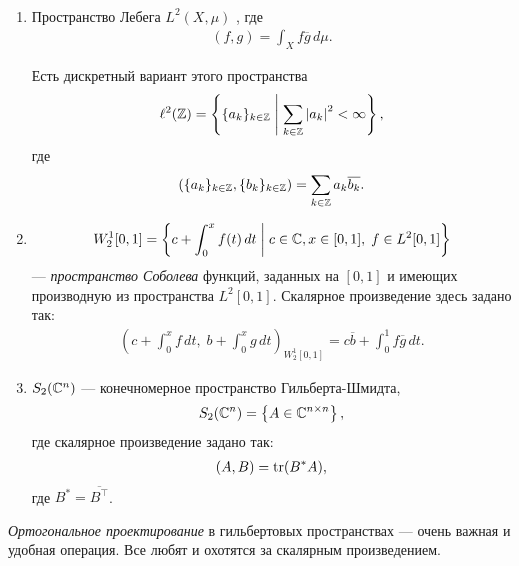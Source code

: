 \documentclass[../complex-analysis.tex]{subfiles}
\begin{document}
\begin{exmpl}\
\begin{enumerate}
 \item Пространство Лебега $ L^{2}(X,\mu) $ , где
  \begin{align*}
   (f,g) = \int_{X} f\overline g\,d\mu. 
  \end{align*}

  Есть дискретный вариант этого пространства
  \begin{align*}
       \ell^{2}(\mathbb{Z}) = \left\{ \{a_{k}\}_{k \in \mathbb{Z}} \;\middle|\; \sum_{k \in \mathbb{Z}}\left| a_k \right|^{2} < \infty  \right\},
  \end{align*} где
  \begin{align*}
   \left( \{a_{k}\}_{k \in \mathbb{Z}}, \{b_{k}\}_{k \in \mathbb{Z}} \right) = \sum_{k \in\mathbb{Z}} a_k \overline{b_k}.
  \end{align*}
 \item 
  \begin{align*}
   W_2^{1} [0,1] = \left\{ c + \int_{0}^{x} f(t)\,dt \;\middle|\; c \in \mathbb{C}, x \in [0,1],\; f \in L^{2}[0,1] \right\}
  \end{align*} --- \textit{пространство Соболева} функций, заданных на $ [0,1] $ и имеющих производную из пространства $ L^{2}[0,1] $. Скалярное произведение здесь задано так:
  \begin{align*}
   \left( c + \int_{0}^{x} f\,dt,\; b + \int_{0}^{x} g\,dt \right)_{W_2^{1}[0,1]} = c \overline b + \int_{0}^{1} f\overline g\,dt.
  \end{align*}

 \item $ S_2(\mathbb{C}^{n}) $ --- конечномерное пространство Гильберта-Шмидта,
  \begin{align*}
   S_2(\mathbb{C}^{n}) = \left\{ A \in \mathbb{C}^{n \times n} \right\},
  \end{align*} где скалярное произведение задано так:
  \begin{align*}
   (A,B) = \operatorname{tr} (B^{\ast}A),
  \end{align*} где $ B^{\ast} = \overline{B^{\top}} $.
\end{enumerate} 
\end{exmpl}

\textit{Ортогональное проектирование} в гильбертовых пространствах --- очень важная и удобная операция. Все любят и охотятся за скалярным произведением.
\end{document}
